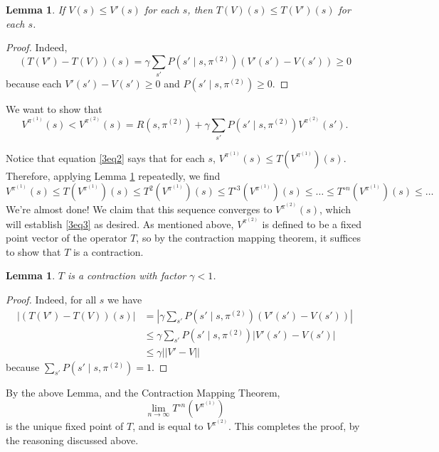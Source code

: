 \documentclass[12pt]{article}
\newtheorem{lemma}[thm]{Lemma}
\theoremstyle{remark}
\begin{document}
\begin{lemma}\label{3lem1}
If $V(s) \leq V'(s)$ for each $s$, then $T(V)(s) \leq T(V')(s)$ for each $s$. 
\end{lemma}

\begin{proof}
Indeed, 
\[
(T(V')-T(V))(s) = \gamma \sum_{s'} P(s' \mid s, \pi^{(2)}) (V'(s') - V(s')) \geq 0
\]
because each $V'(s')-V(s') \geq 0$ and $P(s' \mid s, \pi^{(2)}) \geq 0$. 
\end{proof}

We want to show that 
\begin{equation}\label{3eq3}
V^{\pi^{(1)}}(s)  < V^{\pi^{(2)}} (s)  = R(s, \pi^{(2)}) + \gamma \sum_{s'} P(s' \mid s, \pi^{(2)} ) V^{\pi^{(2)}}(s'). 
\end{equation}

Notice that equation \eqref{3eq2} says that for each $s$, $V^{\pi^{(1)}}(s) \leq T(V^{\pi^{(1)}})(s)$. Therefore, applying Lemma \ref{3lem1} repeatedly, we find 
\[
V^{\pi^{(1)}}(s) \leq T(V^{\pi^{(1)}})(s) \leq T^2(V^{\pi^{(1)}})(s) \leq T^{\circ 3}(V^{\pi^{(1)}})(s) \leq \ldots \leq T^{\circ n}(V^{\pi^{(1)}})(s) \leq \ldots
\]
We're almost done! We claim that this sequence converges to $V^{\pi^{(2)}}(s)$, which will establish \eqref{3eq3} as desired. As mentioned above, $V^{\pi^{(2)}}$ is defined to be a fixed point vector of the operator $T$, so by the contraction mapping theorem, it suffices to show that $T$ is a contraction.

\begin{lemma}
$T$ is a contraction with factor $\gamma < 1$. 
\end{lemma}

\begin{proof}
Indeed, for all $s$ we have 
\begin{align*}
|(T(V')-T(V))(s)| & = |\gamma \sum_{s'} P(s' \mid s, \pi^{(2)}) (V'(s') - V(s'))| \\
&\leq \gamma \sum_{s'} P(s' \mid s, \pi^{(2)}) |V'(s')-V(s')| \\
&\leq \gamma ||V'-V||
\end{align*}
because $\sum_{s'} P(s' \mid s, \pi^{(2)}) = 1$. 
\end{proof}

By the above Lemma, and the Contraction Mapping Theorem, 
\[
\lim_{n \rightarrow \infty} T^{\circ n}(V^{\pi^{(1)}}) 
\]
is the unique fixed point of $T$, and is equal to $V^{\pi^{(2)}}$. This completes the proof, by the reasoning discussed above. \\ 
\end{document}
